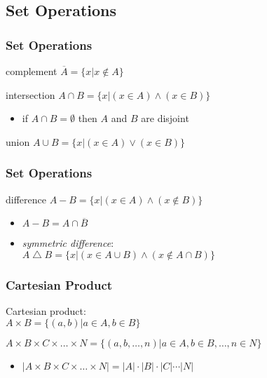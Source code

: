 \documentclass[dvipsnames]{beamer}
\begin{document}
\subsection{Set Operations}

\begin{frame}
  \frametitle{Set Operations}

  \begin{block}{complement}
    $\overline{A} = \{ x | x \notin A \} $
  \end{block}

  \pause
  \begin{block}{intersection}
    $A \cap B = \{ x | (x \in A) \wedge (x \in B) \}$

    \begin{itemize}
      \item if $A \cap B = \emptyset$ then $A$ and $B$ are \alert{disjoint}
    \end{itemize}
  \end{block}

  \pause
  \begin{block}{union}
    $A \cup B = \{ x | (x \in A) \vee (x \in B) \}$
  \end{block}
\end{frame}

\begin{frame}
  \frametitle{Set Operations}

  \begin{block}{difference}
    $A - B = \{ x | (x \in A) \wedge (x \notin B) \}$

    \begin{itemize}
      \item $A-B = A \cap \overline{B}$
    \end{itemize}
  \end{block}

  \pause
  \begin{itemize}
    \item \emph{symmetric difference}:\\
      $A \bigtriangleup B = \{ x | (x \in A \cup B)
                            \wedge (x \notin A \cap B) \}$
  \end{itemize}
\end{frame}

\begin{frame}
  \frametitle{Cartesian Product}

  \begin{definition}
    \alert{Cartesian product}:\\
      $A \times B = \{(a,b) | a \in A, b \in B\}$

      \medskip
      $A \times B \times C \times \dots \times N =
        \{(a,b,\ldots,n) | a \in A, b \in B, \ldots, n \in N\}$
  \end{definition}

  \medskip
  \begin{itemize}
    \item $|A \times B \times C \times \dots \times N| =
      |A| \cdot |B| \cdot |C| \cdots|N|$
  \end{itemize}
\end{frame}
\end{document}
